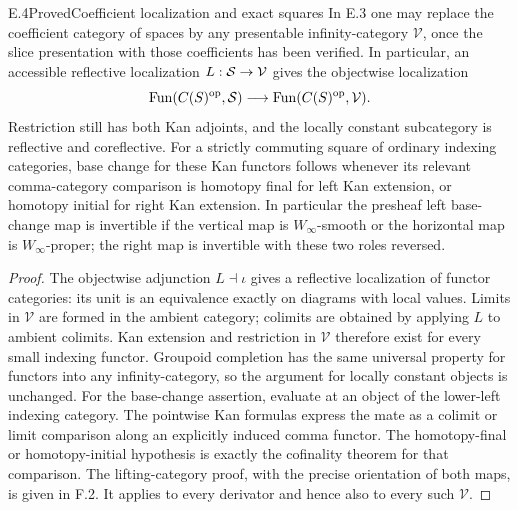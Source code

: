 \begin{claim}{E.4}{Proved}{Coefficient localization and exact squares}
In E.3 one may replace the coefficient category of spaces by any presentable infinity-category $\mathcal V$, once the slice presentation with those coefficients has been verified. In particular, an accessible reflective localization $L:\mathcal S\to\mathcal V$ gives the objectwise localization
\[
 \mathrm{Fun}(C(S)^{\mathrm{op}},\mathcal S)\longrightarrow\mathrm{Fun}(C(S)^{\mathrm{op}},\mathcal V).
\]
Restriction still has both Kan adjoints, and the locally constant subcategory is reflective and coreflective. For a strictly commuting square of ordinary indexing categories, base change for these Kan functors follows whenever its relevant comma-category comparison is homotopy final for left Kan extension, or homotopy initial for right Kan extension. In particular the presheaf left base-change map is invertible if the vertical map is $W_\infty$-smooth or the horizontal map is $W_\infty$-proper; the right map is invertible with these two roles reversed.
\end{claim}
\begin{proof}
The objectwise adjunction $L\dashv\iota$ gives a reflective localization of functor categories: its unit is an equivalence exactly on diagrams with local values. Limits in $\mathcal V$ are formed in the ambient category; colimits are obtained by applying $L$ to ambient colimits. Kan extension and restriction in $\mathcal V$ therefore exist for every small indexing functor. Groupoid completion has the same universal property for functors into any infinity-category, so the argument for locally constant objects is unchanged. For the base-change assertion, evaluate at an object of the lower-left indexing category. The pointwise Kan formulas express the mate as a colimit or limit comparison along an explicitly induced comma functor. The homotopy-final or homotopy-initial hypothesis is exactly the cofinality theorem for that comparison. The lifting-category proof, with the precise orientation of both maps, is given in F.2. It applies to every derivator and hence also to every such $\mathcal V$.
\end{proof}

